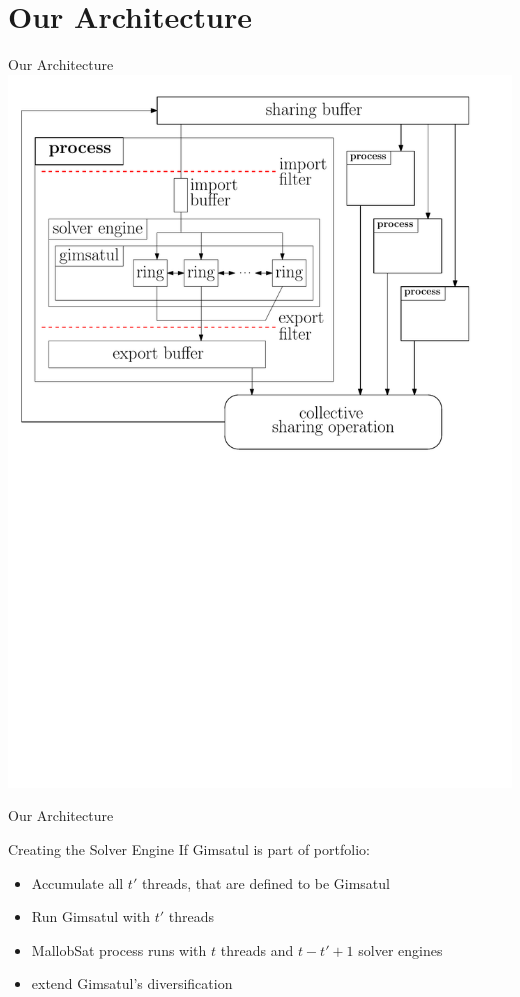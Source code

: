 \documentclass{beamer}
\begin{document}
\section{Our Architecture}
\begin{frame}{Our Architecture}
    \center
    \includegraphics[scale=.45]{figures/architecture.pdf}
\end{frame}

\begin{frame}{Our Architecture}
    \begin{block}{Creating the Solver Engine}
        If Gimsatul is part of portfolio:
        \begin{itemize}
            \item Accumulate all $t'$ threads, that are defined to be Gimsatul
            \item Run Gimsatul with $t'$ threads
            \item MallobSat process runs with $t$ threads and $t - t' + 1$ solver engines
            \item extend Gimsatul's diversification
        \end{itemize}
    \end{block}
\end{frame}
\end{document}
